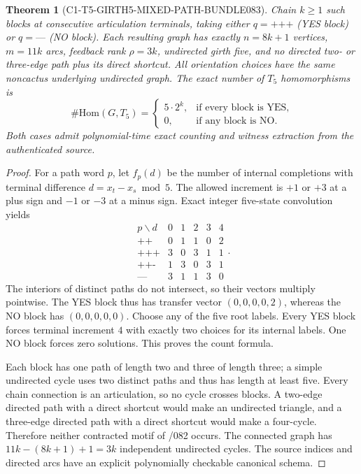 \documentclass[11pt]{article}
\newtheorem{theorem}{Theorem}
\begin{document}
\begin{theorem}[C1-T5-GIRTH5-MIXED-PATH-BUNDLE083]
Chain $k\ge1$ such blocks at consecutive articulation
terminals, taking either $q=\texttt{+++}$ (YES block)
or $q=\texttt{---}$ (NO block).
Each resulting graph has exactly $n=8k+1$ vertices,
$m=11k$ arcs, feedback rank $\rho=3k$, undirected girth
five, and no directed two- or three-edge path plus its
direct shortcut. All orientation choices have the same
noncactus underlying undirected graph.
The exact number of $T_5$ homomorphisms is
\[
\#\mathrm{Hom}(G,T_5)=
\begin{cases}
5\cdot 2^k,&\text{if every block is YES},\\
0,&\text{if any block is NO}.
\end{cases}
\]
Both cases admit polynomial-time exact counting and
witness extraction from the authenticated source.
\end{theorem}
\begin{proof}
For a path word $p$, let $f_p(d)$ be the number of
internal completions with terminal difference
$d=x_t-x_s\bmod5$.
The allowed increment is $+1$ or $+3$ at a plus sign
and $-1$ or $-3$ at a minus sign. Exact integer
five-state convolution yields
\[
\begin{array}{c|rrrrr}
p\backslash d&0&1&2&3&4\\ \hline
\texttt{++}&0&1&1&0&2\\
\texttt{+++}&3&0&3&1&1\\
\texttt{++-}&1&3&0&3&1\\
\texttt{---}&3&1&1&3&0
\end{array}.
\]
The interiors of distinct paths do not intersect, so
their vectors multiply pointwise.
The YES block thus has transfer vector $(0,0,0,0,2)$,
whereas the NO block has $(0,0,0,0,0)$.
Choose any of the five root labels. Every YES block
forces terminal increment $4$ with exactly two choices
for its internal labels. One NO block forces zero
solutions. This proves the count formula.

Each block has one path of length two and three of length
three; a simple undirected cycle uses two distinct paths
and thus has length at least five. Every chain connection
is an articulation, so no cycle crosses blocks. A
two-edge directed path with a direct shortcut would make
an undirected triangle, and a three-edge directed path
with a direct shortcut would make a four-cycle. Therefore
neither contracted motif of /082 occurs.
The connected graph has $11k-(8k+1)+1=3k$ independent
undirected cycles. The source indices and directed arcs
have an explicit polynomially checkable canonical schema.
\end{proof}
\end{document}
